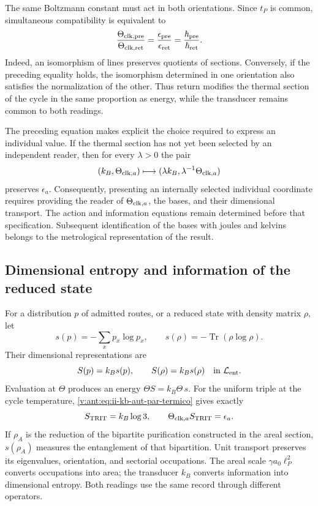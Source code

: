 The same Boltzmann constant must act in both orientations.
Since \(t_P\) is common, simultaneous compatibility is equivalent to
\begin{equation}
 \frac{\Theta_{{\rm clk},{\rm pre}}}{\Theta_{{\rm clk},{\rm ret}}}
 =\frac{\epsilon_{\rm pre}}{\epsilon_{\rm ret}}
 =\frac{\hbar_{\rm pre}}{\hbar_{\rm ret}}.
 \label{v:ant:eq:ii-kb-aut-orientaciones}
\end{equation}
Indeed, an isomorphism of lines preserves quotients of sections.
Conversely, if the preceding equality holds, the isomorphism
determined in one orientation also satisfies the normalization of
the other. Thus return modifies the thermal section of the cycle in the
same proportion as energy, while the transducer remains
common to both readings.

The preceding equation makes explicit the choice required to express an
individual value. If the thermal section has not yet been selected
by an independent reader, then for every \(\lambda>0\) the pair
\[
 (k_B,\Theta_{{\rm clk},a})
 \longmapsto(\lambda k_B,\lambda^{-1}\Theta_{{\rm clk},a})
\]
preserves \(\epsilon_a\). Consequently, presenting an
internally selected individual coordinate requires providing the reader of
\(\Theta_{{\rm clk},a}\), the bases, and their dimensional transport.
The action and information equations remain determined before
that specification. Subsequent identification of the bases with
joules and kelvins belongs to the metrological representation of the result.

\subsection{Dimensional entropy and information of the reduced state}

For a distribution \(p\) of admitted routes, or a reduced state
with density matrix \(\rho\), let
\[
 s(p)=-\sum_xp_x\log p_x,\qquad
 s(\rho)=-\operatorname{Tr}(\rho\log\rho).
\]
Their dimensional representations are
\begin{equation}
 S(p)=k_Bs(p),\qquad S(\rho)=k_Bs(\rho)
 \quad\text{in }\mathcal L_{\rm ent}.
 \label{v:ant:eq:ii-kb-aut-entropia}
\end{equation}
Evaluation at \(\Theta\) produces an energy
\(\Theta S=k_B\Theta\,s\). For the uniform triple at the cycle
temperature, \eqref{v:ant:eq:ii-kb-aut-par-termico} gives exactly
\[
 S_{\rm TRIT}=k_B\log3,\qquad
 \Theta_{{\rm clk},a}S_{\rm TRIT}=\epsilon_a.
\]
If \(\rho_A\) is the reduction of the bipartite purification
constructed in the areal section, \(s(\rho_A)\) measures the entanglement
of that bipartition. Unit transport preserves its
eigenvalues, orientation, and sectorial occupations. The areal scale
\(\gamma a_0\ell_P^2\) converts occupations into area; the
transducer \(k_B\) converts information into dimensional entropy.
Both readings use the same record through different operators.

